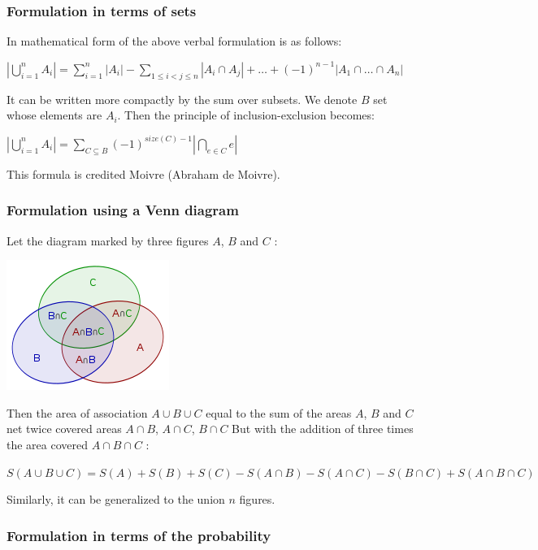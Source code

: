 \subsubsection{ Formulation in terms of sets }

In mathematical form of the above verbal formulation is as follows:

$\left|\bigcup_{i=1}^{n}A_{i}\right|=\sum_{i=1}^{n}|A_{i}|-\sum_{1\le i<j\leq n}|A_{i}\cap A_{j}|+\ldots+(-1)^{n-1}|A_{1}\cap\ldots\cap A_{n}|$

It can be written more compactly by the sum over subsets. We denote $B$ set whose elements are $A_i$. Then the principle of inclusion-exclusion becomes:

$\left|\bigcup_{i=1}^{n}A_{i}\right|=\sum_{C\subseteq B}(-1)^{size(C)-1}\left|\bigcap_{e\in C}e\right|$

This formula is credited Moivre (Abraham de Moivre).

\subsubsection{ Formulation using a Venn diagram }

Let the diagram marked by three figures $A$, $B$ and $C$ :

\includegraphics[scale=0.75]{1.png}

Then the area of ​​association $A \cup B \cup C$ equal to the sum of the areas $A$, $B$ and $C$ net twice covered areas $A \cap B$, $A \cap C$, $B \cap C$ But with the addition of three times the area covered $A \cap B \cap C$ :

$S(A\cup B\cup C)=S(A)+S(B)+S(C)-S(A\cap B)-S(A\cap C)-S(B\cap C)+S(A\cap B\cap C)$

Similarly, it can be generalized to the union $n$ figures.

\subsubsection{ Formulation in terms of the probability }

